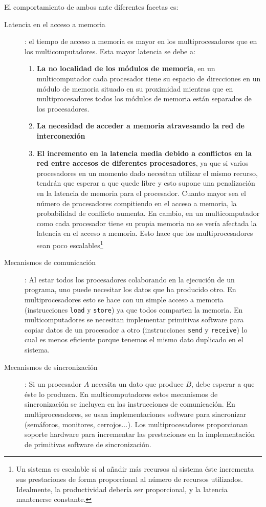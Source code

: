 \documentclass[10pt,a4paper,spanish]{report}
\begin{document}
El comportamiento de ambos ante diferentes facetas es:
\begin{description}
\item[Latencia en el acceso a memoria]: el tiempo de acceso a memoria es mayor en los multiprocesadores que en los multicomputadores. Esta mayor latencia se debe a:
\begin{enumerate}[\color{azul}{\bf $\heartsuit$}]
\item \textbf{\textcolor[rgb]{0.2,0.4,0.8}{La no localidad de los módulos de memoria}}, en un multicomputador cada procesador tiene su espacio de direcciones en un módulo de memoria situado en su proximidad mientras que en multiprocesadores todos los módulos de memoria están separados de los procesadores.
\item \textbf{\textcolor[rgb]{0.2,0.4,0.8}{La necesidad de acceder a memoria atravesando la red de interconexión}}
\item \textbf{\textcolor[rgb]{0.2,0.4,0.8}{El incremento en la latencia media debido a conflictos en la red entre accesos de diferentes procesadores}}, ya que si varios procesadores en un momento dado necesitan utilizar el mismo recurso, tendrán que esperar a que quede libre y esto supone una penalización en la latencia de memoria para el procesador. Cuanto mayor sea el número de procesadores compitiendo en el acceso a memoria, la probabilidad de conflicto aumenta. En cambio, en un multicomputador como cada procesador tiene su propia memoria no se vería afectada la latencia en el acceso a memoria. Esto hace que los multiprocesadores sean poco escalables\footnote{Un sistema es escalable si al añadir más recursos al sistema éste incrementa sus prestaciones de forma proporcional al número de recursos utilizados. Idealmente, la productividad debería ser proporcional, y la latencia mantenerse constante.}
\end{enumerate}
\item[Mecanismos de comunicación]: Al estar todos los procesadores colaborando en la ejecución de un programa, uno puede necesitar los datos que ha producido otro. En multiprocesadores esto se hace con un simple acceso a memoria (instrucciones \verb*|load| y \verb*|store|) ya que todos comparten la memoria. En multicomputadores se necesitan implementar primitivas software para copiar datos de un procesador a otro (instrucciones \verb*|send| y \verb*|receive|) lo cual es menos eficiente porque tenemos el mismo dato duplicado en el sistema.
\item[Mecanismos de sincronización]: Si un procesador $A$ necesita un dato que produce $B$, debe esperar a que éste lo produzca. En multicomputadores estos mecanismos de sincronización se incluyen en las instrucciones de comunicación. En multiprocesadores, se usan implementaciones software para sincronizar (semáforos, monitores, cerrojos...). Los multiprocesadores proporcionan soporte hardware para incrementar las prestaciones en la implementación de primitivas software de sincronización.

\end{description}
\end{document}

